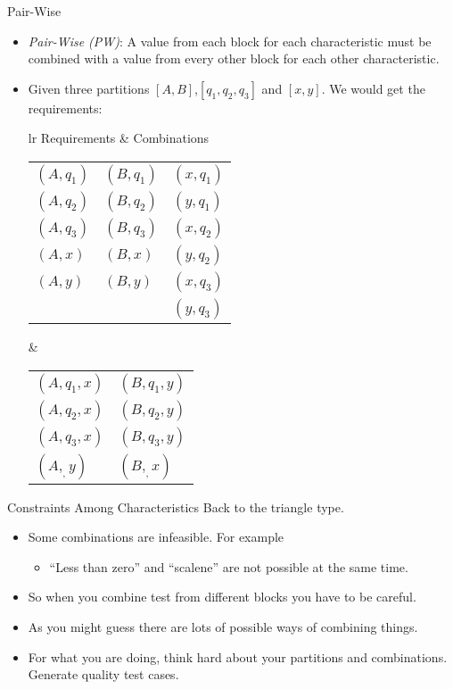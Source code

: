 \documentclass{beamer}
\begin{document}
\begin{frame}{Pair-Wise}
  \begin{itemize}
  \item {\em Pair-Wise (PW)}: A value from each block for each
    characteristic must be combined with a value from every other
    block for each other characteristic.
  \item Given three partitions  $[A,B]$,$[q_1,q_2,q_3]$ and
    $[x,y]$. We would get the requirements:

{\small
\begin{tabular}{lr}
  {\large Requirements} & {\large Combinations} \\
    \begin{tabular}{lll}
      $(A,q_1)$ & $(B,q_1)$ & $(x,q_1)$ \\
      $(A,q_2)$ & $(B,q_2)$ & $(y,q_1)$ \\
      $(A,q_3)$ & $(B,q_3)$ & $(x,q_2)$ \\
      $(A,x)$  & $(B,x)$   & $(y,q_2)$ \\
      $(A,y)$  & $(B,y)$   & $(x,q_3)$ \\
               &           & $(y,q_3)$
    \end{tabular}
&  
\begin{tabular}{ll}
  $(A,q_1,x)$ & $(B,q_1,y)$ \\
  $(A,q_2,x)$ & $(B,q_2,y)$ \\
  $(A,q_3,x)$ & $(B,q_3,y)$ \\
  $(A,_,y)$ & $(B,_,x)$ 
\end{tabular}
\end{tabular}
}
  \end{itemize}
\end{frame}
\begin{frame}{Constraints Among Characteristics}
  Back to the triangle type.
  \begin{itemize}
  \item Some combinations are infeasible. For example
    \begin{itemize}
    \item ``Less than zero'' and ``scalene'' are not possible at the same time.
    \end{itemize}
  \item So when you combine test from different blocks you have to be
    careful.
  \item As you might guess there are lots of possible ways of combining
    things.
    \item For what you are doing, think hard about your partitions and
      combinations. Generate quality test cases.
      
  \end{itemize}

  
\end{frame}
\end{document}
